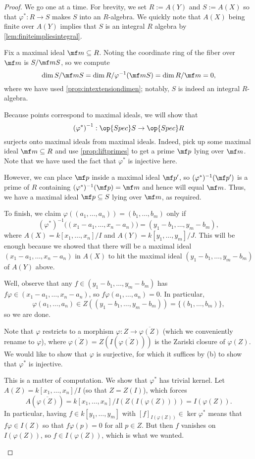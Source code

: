 \begin{proof}
	We go one at a time. For brevity, we set $R:=A(Y)$ and $S:=A(X)$ so that $\varphi^*:R\to S$ makes $S$ into an $R$-algebra. We quickly note that $A(X)$ being finite over $A(Y)$ implies that $S$ is an integral $R$ algebra by \autoref{lem:finiteimpliesintegral}.
	\begin{listalph}
		\item Fix a maximal ideal $\mf m\subseteq R$. Noting the coordinate ring of the fiber over $\mf m$ is $S/\mf mS$, so we compute
		\[\dim S/\mf mS=\dim R/\varphi^{-1}(\mf mS)=\dim R/\mf m=0,\]
		where we have used \autoref{prop:intextensiondimen}; notably, $S$ is indeed an integral $R$-algebra.

		\item Because points correspond to maximal ideals, we will show that
		\[\left(\varphi^*\right)^{-1}:\op{Spec}S\to\op{Spec}R\]
		surjects onto maximal ideals from maximal ideals. Indeed, pick up some maximal ideal $\mf m\subseteq R$ and use \autoref{prop:liftprimes} to get a prime $\mf p$ lying over $\mf m$. Note that we have used the fact that $\varphi^*$ is injective here.
		
		However, we can place $\mf p$ inside a maximal ideal $\mf p'$, so $(\varphi^*)^{-1}(\mf p')$ is a prime of $R$ containing $(\varphi^*)^{-1}(\mf p)=\mf m$ and hence will equal $\mf m$. Thus, we have a maximal ideal $\mf p\subseteq S$ lying over $\mf m$, as required.
		
		To finish, we claim $\varphi((a_1,\ldots,a_n))=(b_1,\ldots,b_m)$ only if
		\[\left(\varphi^*\right)^{-1}\big((x_1-a_1,\ldots,x_n-a_n)\big)=(y_1-b_1,\ldots,y_m-b_m),\]
		where $A(X)=k[x_1,\ldots,x_n]/I$ and $A(Y)=k[y_1,\ldots,y_m]/J$. This will be enough because we showed that there will be a maximal ideal $(x_1-a_1,\ldots,x_n-a_n)$ in $A(X)$ to hit the maximal ideal $(y_1-b_1,\ldots,y_m-b_m)$ of $A(Y)$ above.

		Well, observe that any $f\in(y_1-b_1,\ldots,y_m-b_m)$ has $f\varphi\in(x_1-a_1,\ldots,x_n-a_n)$, so $f\varphi(a_1,\ldots,a_n)=0$. In particular,
		\[\varphi(a_1,\ldots,a_n)\in Z((y_1-b_1,\ldots,y_m-b_m))=\{(b_1,\ldots,b_m)\},\]
		so we are done.
		
		\item Note that $\varphi$ restricts to a morphism $\varphi:Z\to\overline{\varphi(Z)}$ (which we conveniently rename to $\varphi$), where $\overline{\varphi(Z)}=Z(I(\overline{\varphi(Z)}))$ is the Zariski closure of $\varphi(Z)$. We would like to show that $\varphi$ is surjective, for which it suffices by (b) to show that $\varphi^*$ is injective.

		This is a matter of computation. We show that $\varphi^*$ has trivial kernel. Let $A(Z)=k[x_1,\ldots,x_n]/I$ (so that $Z=Z(I)$), which forces
		\[A(\overline{\varphi(Z)})=k[x_1,\ldots,x_n]/I(Z(I(\varphi(Z))))=I(\varphi(Z)).\]
		In particular, having $f\in k[y_1,\ldots,y_m]$ with $[f]_{I(\varphi(Z))}\in\ker\varphi^*$ means that $f\varphi\in I(Z)$ so that $f\varphi(p)=0$ for all $p\in Z$. But then $f$ vanishes on $I(\varphi(Z))$, so $f\in I(\varphi(Z))$, which is what we wanted.
		\qedhere
	\end{listalph}
\end{proof}
